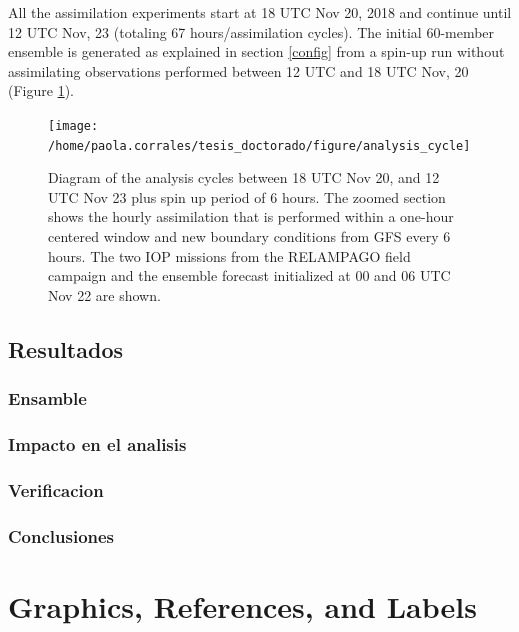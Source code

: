 \documentclass[12pt,twoside]{reedthesis}
\begin{document}
All the assimilation experiments start at 18 UTC Nov 20, 2018 and continue until 12 UTC Nov, 23 (totaling 67 hours/assimilation cycles). The initial 60-member ensemble is generated as explained in section \ref{config} from a spin-up run without assimilating observations performed between 12 UTC and 18 UTC Nov, 20 (Figure \ref{fig:cycle}).


\begin{figure}
\texttt{[image: /home/paola.corrales/tesis\_doctorado/figure/analysis\_cycle]} \caption{Diagram of the analysis cycles between 18 UTC Nov 20, and 12 UTC Nov 23 plus spin up period of 6 hours. The zoomed section shows the hourly assimilation that is performed within a one-hour centered window and new boundary conditions from GFS every 6 hours. The two IOP missions from the RELAMPAGO field campaign and the ensemble forecast initialized at 00 and 06 UTC Nov 22 are shown.}\label{fig:cycle}
\end{figure}
\hypertarget{resultados}{%
\section{Resultados}\label{resultados}}

\hypertarget{ensamble}{%
\subsection{Ensamble}\label{ensamble}}

\hypertarget{impacto-en-el-analisis}{%
\subsection{Impacto en el analisis}\label{impacto-en-el-analisis}}

\hypertarget{verificacion}{%
\subsection{Verificacion}\label{verificacion}}

\hypertarget{conclusiones}{%
\subsection{Conclusiones}\label{conclusiones}}

\hypertarget{ref-labels}{%
\chapter{Graphics, References, and Labels}\label{ref-labels}}
\end{document}
